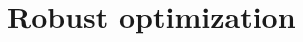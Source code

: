 \documentclass{beamer}
\begin{document}
\section[Robust optim.]{Robust optimization}
\subsection{}



\end{document}

